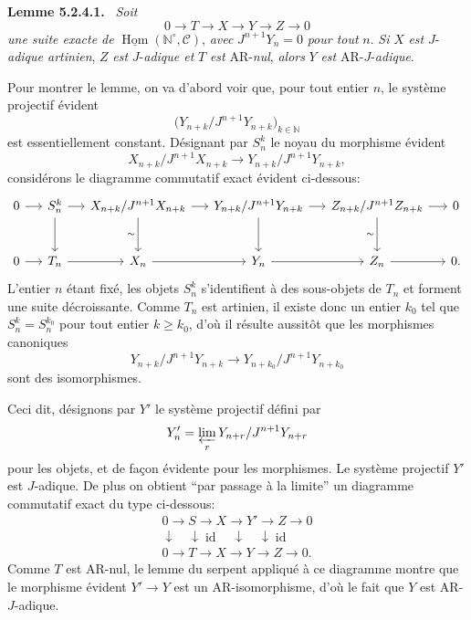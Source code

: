 \documentclass[11pt]{article}
\newenvironment{statement}[1]{\par\medskip\noindent\textbf{#1.}\ }{\par\medskip}
\DeclareMathOperator{\Hom}{Hom}
\providecommand{\uHom}{\underline{\Hom}}
\providecommand{\id}{\operatorname{id}}
\providecommand{\Hom}{\operatorname{Hom}}
\providecommand{\id}{\operatorname{id}}
\providecommand{\id}{\operatorname{id}}
\providecommand{\id}{\operatorname{id}}
\providecommand{\id}{\operatorname{id}}
\providecommand{\Hom}{\operatorname{Hom}}
\providecommand{\id}{\operatorname{id}}
\begin{document}
\begin{statement}{Lemme 5.2.4.1}
\emph{Soit}
\[
0\longrightarrow T\longrightarrow X\longrightarrow Y\longrightarrow Z\longrightarrow0
\]
\emph{une suite exacte de} \(\uHom(\mathbb N^\circ,\mathcal C)\), \emph{avec} \(J^{n+1}Y_n=0\) \emph{pour tout} \(n\). \emph{Si} \(X\) \emph{est} \(J\)-\emph{adique artinien}, \(Z\) \emph{est} \(J\)-\emph{adique et} \(T\) \emph{est} AR-\emph{nul}, \emph{alors} \(Y\) \emph{est} AR-\(J\)-\emph{adique}.
\end{statement}

Pour montrer le lemme, on va d'abord voir que, pour tout entier \(n\), le système projectif évident
\[
\bigl(Y_{n+k}/J^{n+1}Y_{n+k}\bigr)_{k\in\mathbb N}
\]
est essentiellement constant. Désignant par \(S_n^k\) le noyau du morphisme évident
\[
X_{n+k}/J^{n+1}X_{n+k}\longrightarrow
Y_{n+k}/J^{n+1}Y_{n+k},
\]
considérons le diagramme commutatif exact évident ci-dessous:
\[
\begin{tikzcd}[column sep=1.35em,row sep=large]
0 \arrow[r] & S_n^k \arrow[r] \arrow[d] & X_{n+k}/J^{n+1}X_{n+k} \arrow[r] \arrow[d,"\sim"'] & Y_{n+k}/J^{n+1}Y_{n+k} \arrow[r] \arrow[d] & Z_{n+k}/J^{n+1}Z_{n+k} \arrow[r] \arrow[d,"\sim"'] & 0\\
0 \arrow[r] & T_n \arrow[r] & X_n \arrow[r] & Y_n \arrow[r] & Z_n \arrow[r] & 0 .
\end{tikzcd}
\]
L'entier \(n\) étant fixé, les objets \(S_n^k\) s'identifient à des sous-objets de \(T_n\) et forment une suite décroissante. Comme \(T_n\) est artinien, il existe donc un entier \(k_0\) tel que \(S_n^k=S_n^{k_0}\) pour tout entier \(k\ge k_0\), d'où il résulte aussitôt que les morphismes canoniques
\[
Y_{n+k}/J^{n+1}Y_{n+k}
\longrightarrow
Y_{n+k_0}/J^{n+1}Y_{n+k_0}
\]
sont des isomorphismes.

Ceci dit, désignons par \(Y'\) le système projectif défini par
\[
Y'_n=\varprojlim_r Y_{n+r}/J^{n+1}Y_{n+r}
\]
pour les objets, et de façon évidente pour les morphismes. Le système projectif \(Y'\) est \(J\)-adique. De plus on obtient ``par passage à la limite'' un diagramme commutatif exact du type ci-dessous:
\[
\begin{array}{ccccc}
0\to S\to X\to Y'\to Z\to0\\
\downarrow\quad\downarrow\id\quad\downarrow\quad\downarrow\id\\
0\to T\to X\to Y\to Z\to0 .
\end{array}
\]
Comme \(T\) est AR-nul, le lemme du serpent appliqué à ce diagramme montre que le morphisme évident \(Y'\to Y\) est un AR-isomorphisme, d'où le fait que \(Y\) est AR-\(J\)-adique.
\end{document}
